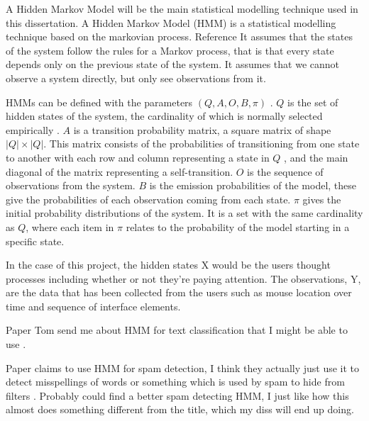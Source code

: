 \documentclass{article}
\begin{document}


A Hidden Markov Model will be the main statistical modelling technique used in this dissertation.
A Hidden Markov Model (HMM) is a statistical modelling technique based on the markovian process. Reference
It assumes that the states of the system follow the rules for a Markov process, that is that every state depends only on the previous state of the system.
It assumes that we cannot observe a system directly, but only see observations from it.

HMMs can be defined with the parameters $(Q,A,O,B,\pi)$ \cite{jurafsky2018speech}.
$Q$ is the set of hidden states of the system, the cardinality of which is normally selected empirically \cite{ibe2013markov}.
$A$ is a transition probability matrix, a square matrix of shape $|Q|\times|Q|$.
This matrix consists of the probabilities of transitioning from one state to another with each row and column representing a state in $Q$
, and the main diagonal of the matrix representing a self-transition.
$O$ is the sequence of observations from the system.
$B$ is the emission probabilities of the model, these give the probabilities of each observation coming from each state.
$\pi$ gives the initial probability distributions of the system.
It is a set with the same cardinality as $Q$, where each item in $\pi$ relates to the probability of the model starting in a specific state.


In the case of this project, the hidden states X would be the users thought processes including whether or not they're paying attention.
The observations, Y, are the data that has been collected from the users such as mouse location over time and sequence of interface elements.

Paper Tom send me about HMM for text classification that I might be able to use \cite{collins2016tagging}.

Paper claims to use HMM for spam detection, I think they actually just use it to detect misspellings of words or something which is used by spam to hide from filters \cite{gordillo2007hmm}.
Probably could find a better spam detecting HMM, I just like how this almost does something different from the title, which my diss will end up doing.
\end{document}
